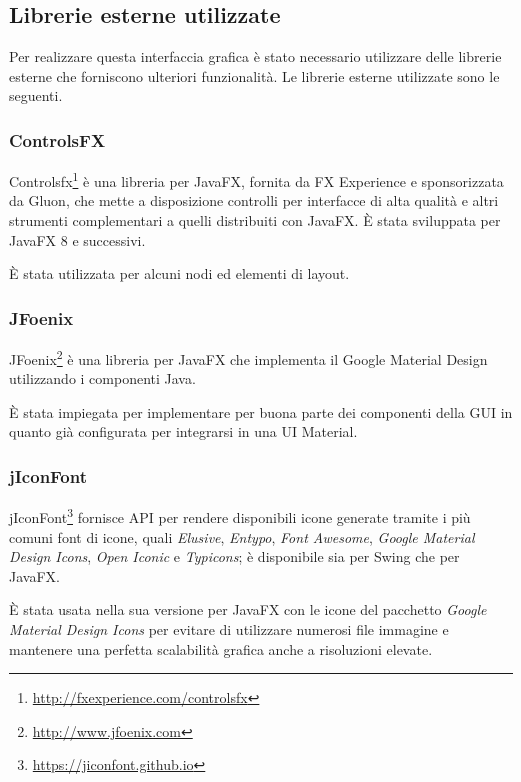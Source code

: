         \subsection{Librerie esterne utilizzate}\label{sub:lib}
            Per realizzare questa interfaccia grafica è stato necessario utilizzare delle librerie esterne che forniscono ulteriori funzionalità.
            Le librerie esterne utilizzate sono le seguenti.

            \subsubsection{ControlsFX}\label{subsub:controlsfx}
                Controlsfx\footnote{\url{http://fxexperience.com/controlsfx}} è una libreria  per JavaFX, fornita da FX Experience e sponsorizzata da Gluon, che mette a disposizione controlli per interfacce di alta qualità e altri strumenti complementari a quelli distribuiti con JavaFX.
                È stata sviluppata per JavaFX 8 e successivi.

                È stata utilizzata per alcuni nodi ed elementi di layout.

            \subsubsection{JFoenix}\label{subsub:jfoenix}
                JFoenix\footnote{\url{http://www.jfoenix.com}} è una libreria  per JavaFX che implementa il Google Material Design utilizzando i componenti Java.

                È stata impiegata per implementare per buona parte dei componenti della GUI in quanto già configurata per integrarsi in una UI Material.

            \subsubsection{jIconFont}\label{subsub:jiconfont}
                jIconFont\footnote{\url{https://jiconfont.github.io}} fornisce API per rendere disponibili icone generate tramite i più comuni font di icone, quali \emph{Elusive}, \emph{Entypo}, \emph{Font Awesome}, \emph{Google Material Design Icons}, \emph{Open Iconic} e \emph{Typicons}; è disponibile sia per Swing che per JavaFX.

                È stata usata nella sua versione per JavaFX con le icone del pacchetto \emph{Google Material Design Icons} per evitare di utilizzare numerosi file immagine e mantenere una perfetta scalabilità grafica anche a risoluzioni elevate.

